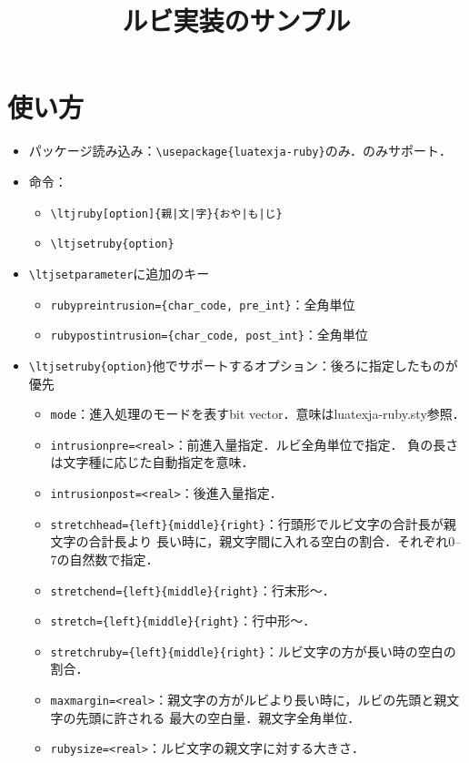 \documentclass[b5paper,10pt]{ltjsarticle}
\title{ルビ実装のサンプル}
\begin{document}
%
\maketitle

\section{使い方}
\begin{itemize}
\item パッケージ読み込み：\verb+\usepackage{luatexja-ruby}+のみ．\LaTeXe のみサポート．
\item 命令：
\begin{itemize}
\item \verb+\ltjruby[option]{親|文|字}{おや|も|じ}+
\item \verb|\ltjsetruby{option}|
\end{itemize}
\item \verb|\ltjsetparameter|に追加のキー
\begin{itemize}
\item \verb+rubypreintrusion={char_code, pre_int}+：全角単位
\item \verb+rubypostintrusion={char_code, post_int}+：全角単位
\end{itemize}
\item \verb|\ltjsetruby{option}|他でサポートするオプション：後ろに指定したものが優先
\begin{itemize}
\item \verb+mode+：進入処理のモードを表すbit vector．意味はluatexja-ruby.sty参照．
\item \verb+intrusionpre=<real>+：前進入量指定．ルビ全角単位で指定．
負の長さは文字種に応じた自動指定を意味．
\item \verb+intrusionpost=<real>+：後進入量指定．
\item \verb+stretchhead={left}{middle}{right}+：行頭形でルビ文字の合計長が親文字の合計長より
長い時に，親文字間に入れる空白の割合．それぞれ0--7の自然数で指定．
\item \verb+stretchend={left}{middle}{right}+：行末形〜．
\item \verb+stretch={left}{middle}{right}+：行中形〜．
\item \verb+stretchruby={left}{middle}{right}+：ルビ文字の方が長い時の空白の割合．
\item \verb+maxmargin=<real>+：親文字の方がルビより長い時に，ルビの先頭と親文字の先頭に許される
最大の空白量．親文字全角単位．
\item \verb+rubysize=<real>+：ルビ文字の親文字に対する大きさ．
\end{itemize}
\end{itemize}
\end{document}
